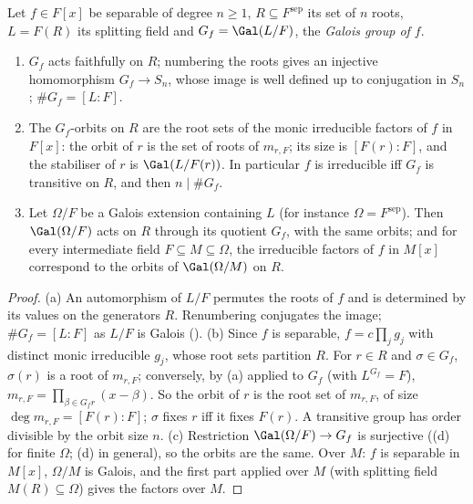 \begin{proposition}\label{prop:galois:polynomial-group}
Let $f\in F[x]$ be separable of degree $n\ge1$, $R\subseteq F^{\mathrm{sep}}$ its set of $n$ roots, $L=F(R)$ its splitting field and $G_f=\Gal(L/F)$, the
\emph{Galois group of $f$}.
\begin{enumerate}[label=(\alph*)]
\item $G_f$ acts faithfully on $R$; numbering the roots gives an injective homomorphism $G_f\to S_n$, whose image is well defined up to conjugation in $S_n$;
$\#G_f=[L:F]$.
\item The $G_f$-orbits on $R$ are the root sets of the monic irreducible factors of $f$ in $F[x]$: the orbit of $r$ is the set of roots of $m_{r,F}$; its size is
$[F(r):F]$, and the stabiliser of $r$ is $\Gal(L/F(r))$. In particular $f$ is irreducible iff $G_f$ is transitive on $R$, and then $n\mid\#G_f$.
\item Let $\Omega/F$ be a Galois extension containing $L$ (for instance $\Omega=F^{\mathrm{sep}}$). Then $\Gal(\Omega/F)$ acts on $R$ through its quotient $G_f$, with
the same orbits; and for every intermediate field $F\subseteq M\subseteq\Omega$, the irreducible factors of $f$ in $M[x]$ correspond to the orbits of
$\Gal(\Omega/M)$ on $R$.
\end{enumerate}
\end{proposition}

\begin{proof}
(a) An automorphism of $L/F$ permutes the roots of $f$ and is determined by its values on the generators $R$. Renumbering conjugates the image; $\#G_f=[L:F]$
as $L/F$ is Galois ().
(b) Since $f$ is separable, $f=c\prod_jg_j$ with distinct monic irreducible $g_j$, whose root sets partition $R$. For $r\in R$ and $\sigma\in G_f$, $\sigma(r)$ is a
root of $m_{r,F}$; conversely, by (a) applied to $G_f$ (with $L^{G_f}=F$), $m_{r,F}=\prod_{\beta\in G_fr}(x-\beta)$. So the orbit of $r$ is the
root set of $m_{r,F}$, of size $\deg m_{r,F}=[F(r):F]$; $\sigma$ fixes $r$ iff it fixes $F(r)$. A transitive group has order divisible by the orbit size $n$.
(c) Restriction $\Gal(\Omega/F)\to G_f$ is surjective ((d) for finite $\Omega$; (d) in general), so the
orbits are the same. Over $M$: $f$ is separable in $M[x]$, $\Omega/M$ is Galois, and the first part applied over $M$ (with splitting field $M(R)\subseteq\Omega$)
gives the factors over $M$.
\end{proof}

